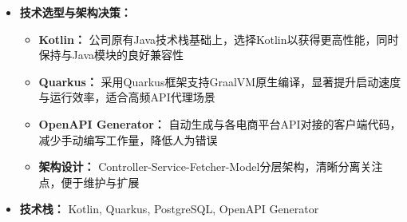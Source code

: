 \documentclass[11pt]{article}
\begin{document}
\begin{itemize}
    \item \textbf{技术选型与架构决策：}
    \begin{itemize}
        \item \textbf{Kotlin：} 公司原有Java技术栈基础上，选择Kotlin以获得更高性能，同时保持与Java模块的良好兼容性
        \item \textbf{Quarkus：} 采用Quarkus框架支持GraalVM原生编译，显著提升启动速度与运行效率，适合高频API代理场景
        \item \textbf{OpenAPI Generator：} 自动生成与各电商平台API对接的客户端代码，减少手动编写工作量，降低人为错误
        \item \textbf{架构设计：} Controller-Service-Fetcher-Model分层架构，清晰分离关注点，便于维护与扩展
    \end{itemize}

    \item \textbf{技术栈：} Kotlin, Quarkus, PostgreSQL, OpenAPI Generator
\end{itemize}


\end{document}
